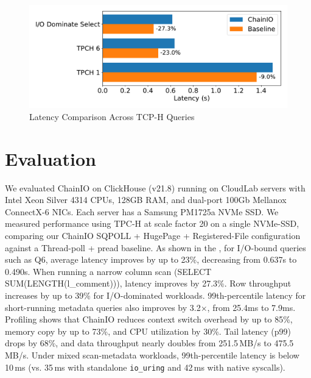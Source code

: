 \documentclass[sigconf,10pt]{acmart}
\newcommand{\sys}{ChainIO\xspace}
\begin{document}
\begin{figure}
\centering
\includegraphics[width=\columnwidth]{img/chainio.pdf}
\caption{Latency Comparison Across TCP-H Queries}\label{fig:experiment}
\end{figure}
\section{Evaluation}\label{sec:evaluation}

We evaluated \sys on ClickHouse (v21.8) running on CloudLab servers with Intel Xeon Silver 4314 CPUs, 128GB RAM, and dual-port 100Gb Mellanox ConnectX-6 NICs. Each server has a Samsung PM1725a NVMe SSD. We measured performance using TPC-H at scale factor 20 on a single NVMe-SSD, comparing our \sys SQPOLL + HugePage + Registered-File configuration against a Thread-poll + pread baseline. As shown in the , for I/O-bound queries such as Q6, average latency improves by up to 23\%, decreasing from 0.637s to 0.490s. When running a narrow column scan (SELECT SUM(LENGTH(l\_comment))), latency improves by 27.3\%. Row throughput increases by up to 39\% for I/O-dominated workloads. 99th-percentile latency for short-running metadata queries also improves by 3.2×, from 25.4ms to 7.9ms. Profiling shows that \sys reduces context switch overhead by up to 85\%, memory copy by up to 73\%, and CPU utilization by 30\%. Tail latency (p99) drops by 68\%, and data throughput nearly doubles from 251.5\,MB/s to 475.5\,MB/s. Under mixed scan-metadata workloads, 99th-percentile latency is below 10\,ms (vs. 35\,ms with standalone \texttt{io\_uring} and 42\,ms with native syscalls).



\end{document}
